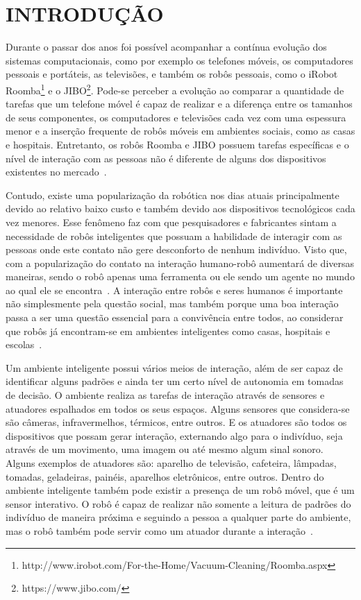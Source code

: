 \chapter{INTRODUÇÃO}
\label{cap:introducao}
Durante o passar dos anos foi possível acompanhar a contínua evolução dos sistemas computacionais, como por exemplo os telefones móveis, os computadores pessoais e portáteis, as televisões, e também os robôs pessoais, como o iRobot Roomba\footnote{http://www.irobot.com/For-the-Home/Vacuum-Cleaning/Roomba.aspx} e o JIBO\footnote{https://www.jibo.com/}. Pode-se perceber a evolução ao comparar a quantidade de tarefas que um telefone móvel é capaz de realizar e a diferença entre os tamanhos de seus componentes, os computadores e televisões cada vez com uma espessura menor e a inserção frequente de robôs móveis em ambientes sociais, como as casas e hospitais. Entretanto, os robôs Roomba e JIBO possuem tarefas específicas e o nível de interação com as pessoas não é diferente de alguns dos dispositivos existentes no mercado~\cite{Heenan:2014}.

Contudo, existe uma popularização da robótica nos dias atuais principalmente devido ao relativo baixo custo e também devido aos dispositivos tecnológicos cada vez menores. Esse fenômeno faz com que pesquisadores e fabricantes sintam a necessidade de robôs inteligentes que possuam a habilidade de interagir com as pessoas onde este contato não gere desconforto de nenhum indivíduo. Visto que, com a popularização do contato na interação humano-robô aumentará de diversas maneiras, sendo o robô apenas uma ferramenta ou ele sendo um agente no mundo ao qual ele se encontra~\cite{Looi:2012}. A interação entre robôs e seres humanos é importante não simplesmente pela questão social, mas também porque uma boa interação passa a ser uma questão essencial para a convivência entre todos, ao considerar que robôs já encontram-se em ambientes inteligentes como casas, hospitais e escolas~\cite{Albo-Canals:2013, Brown:2013}.

Um ambiente inteligente possui vários meios de interação, além de ser capaz de identificar alguns padrões e ainda ter um certo nível de autonomia em tomadas de decisão. O ambiente realiza as tarefas de interação através de sensores e atuadores espalhados em todos os seus espaços. Alguns sensores que considera-se são câmeras, infravermelhos, térmicos, entre outros. E os atuadores são todos os dispositivos que possam gerar interação, externando algo para o indivíduo, seja através de um movimento, uma imagem ou até mesmo algum sinal sonoro. Alguns exemplos de atuadores são: aparelho de televisão, cafeteira, lâmpadas, tomadas, geladeiras, painéis, aparelhos eletrônicos, entre outros. Dentro do ambiente inteligente também pode existir a presença de um robô móvel, que é um sensor interativo. O robô é capaz de realizar não somente a leitura de padrões do indivíduo de maneira próxima e seguindo a pessoa a qualquer parte do ambiente, mas o robô também pode servir como um atuador durante a interação~\cite{Looi:2012,Choi:2014,Dobra:2014}.

